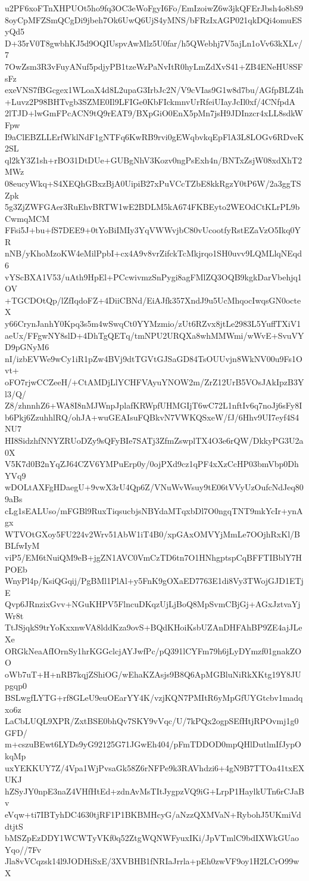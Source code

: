 u2PF6xoFTnXHPUOt5ho9fq3OC3eWoFgyI6Fo/EmIzoiwZ6w3jkQFErJbsh4o8bS9
8oyCpMFZSmQCgDi9jbeh7Ok6UwQ6UjS4yMNS/bFRzIxAGP021qkDQi4omuESyQd5
D+35rV0T8gwbhKJ5d9OQIUspvAwMlz5U0far/h5QWebhj7V5ajLn1oVv63kXLv/7
7OwZsm3R3vFuyANuf5pdjyPB1tzeWzPaNvItR0hyLmZdXvS41+ZB4ENeHU8SFsFz
exeVNS7fBGcgex1WLoaX4d8L2upaG3IrbJc2N/V9cVIas9G1w8d7bu/AGfpBLZ4h
+Luvz2P98BHTvgb3SZME0Il9LFIGe0KbFIckmnvUrRfeiUIayJcIl0xf/4CNfpdA
2lTJD+lwGmFPcACN9tQ9rEAT9/BXpGiO0EnX5pMn7jsH9JDInzcr4xLL8sdkWFpw
I9aClEBZLLErfWklNdF1gNTFq6KwRB9rvi0gEWqbvkqEpFlA3L8LOGv6RDveK2SL
ql2kY3Z1sh+rBO31DtDUe+GUBgNhV3Kozv0ngPsExh4n/BNTxZsjW08xdXhT2MWz
08eucyWkq+S4XEQhGBxzBjA0UipiB27xPuVCcTZbE8kkRgzY0tP6W/2a3ggTSZpk
5g3ZjZWFGAer3RuEhvBRTW1wE2BDLM5kA674FKBEyto2WEOdCtKLrPL9bCwmqMCM
FFsi5J+bu+fS7DEE9+0tYoBiIMIy3YqVWWvjbC80vUcootfyRstEZaVzO5Ikq0YR
nNB/yKhoMzoKW4eMilPpbI+cx4A9v8vrZifckTcMkjrqo1SH0uvv9LQMLlqNEqd6
vYScBXA1V53/uAth9HpEl+PCcwivmzSnPygi8agFMlZQ3OQB9kgkDarVbehjq1OV
+TGCDOtQp/lZfIqdoFZ+4DiiCBNd/EiAJfk357XndJ9u5UcMhqocIwqsGN0octeX
y66CrynJanhY0Kpq3s5m4wSwqCt0YYMzmio/zUt6RZvx8jtLe2983L5YuffTXiV1
aeUx/FFgwNY8slD+4DhTgQETq/tmNPU2URQXa8whMMWmi/wWvE+SvuVYD9pGNyM6
nI/izbEVWe9wCy1iR1pZw4BVj9dtTGVtGJSaGD84TsOUUvjn8WkNV00u9Fs1Ovt+
oFO7rjwCCZeeH/+CtAMDjLlYCHFVAyuYNOW2m/ZrZ12UrB5VOsJAkIpzB3Yl3/Q/
Z8/zhnnhZ6+WA8I8nMJWnpJplafKRWpfUHMGIjT6wC72L1nftIv6q7noJj6sFy8I
b6Pkj6ZzuhhlRQ/ohJA+wuGEAIsuFQBkvN7VWKQSxeW/fJ/6Hhv9UI7eyf4S4NU7
HI8SidzhfNNYZRUoDZy9sQFyBIe7SATj3ZfmZswplTX4O3e6rQW/DkkyPG3U2a0X
V5K7d0B2nYqZJ64CZV6YMPuErp0y/0ojPXd9cz1qPF4xXzCcHP03bmVbp0DhYVq9
wDOLtAXFgHDaegU+9vwX3rU4Qp6Z/VNuWvWsuy9tE06tVVyUzOufcNdJeq809aBs
cLg1sEALUso/mFGBl9RuxTiqsucbjsNBYdaMTqxbDl7O0ngqTNT9mkYcIr+ynAgx
WTVOtGXoy5FU224v2Wrv51AbW1iT4B0/xpGAxOMVYjMmLe7OOjhRxKl/BBLfwIyM
viP5/EM6tNuiQM9eB+jgZN1AVC0VmCzTD6tn7O1HNhgptspCqBFFTIBblY7HPOEb
WnyPl4p/KsiQGqij/PgBMl1PlAl+y5FnK9gOXaED7763E1di8Vy3TWojGJD1ETjE
Qvp6JRnzixGvv+NGuKHPV5FlncuDKqzUjLjBoQ8MpSvmCBjGj+AGxJztvaYjWr8t
TtJSjqkS9trYoKxxnwVA8lddKza9ovS+BQdKHoiKsbUZAnDHFAhBP9ZE4ajJLeXe
ORGkNeaAfIOrnSy1hrKGGclcjAYJwfPc/pQ391lCYFm79h6jLyDYmzf01gnakZOO
oWb7uT+H+nRB7kqjZShiOG/wEhaKZAsjs9B8Q6ApMGBluNiRkXKtg19Y8JUpgqp0
BSLwgfLYTG+rf8GLeU9euOEarYY4K/vzjKQN7PMItR6yMpGfUYGtcbv1madqxo6z
LaCbLUQL9XPR/ZxtBSE0bhQv7SKY9vVqc/U/7kPQx2ogpSEfHtjRPOvmj1g0GFD/
m+cszuBEwt6LYDs9yG92125G71JGwEh404/pFmTDDOD0mpQHlDutlmIfJypOkqMp
uxYEKKUY7Z/4Vpa1WjPvsaGk58Z6rNFPe9k3RAVhdzi6+4gN9B7TTOa41txEXUKJ
hZSyJY0npE3naZ4VHfHtEd+zdnAvMsTItJygpzVQ9iG+LrpP1HaylkUTn6rCJaBv
eVqw+ti7IBTyhDC4630tjRF1P1BKBMHcyG/aNzzQXMVaN+RybohJ5UKmiVddtjtS
bMSZpEzDDY1WCWTyVKf0q52ZtgWQNWFyuxIKi/JpVTmlC9bdIXWkGUaoYqo//7Fv
Jla8vVCqzsk14l9JODHiSxE/3XVBHB1fNRIaJrrla+pEh0zwVF9oy1H2LCrO99wX
